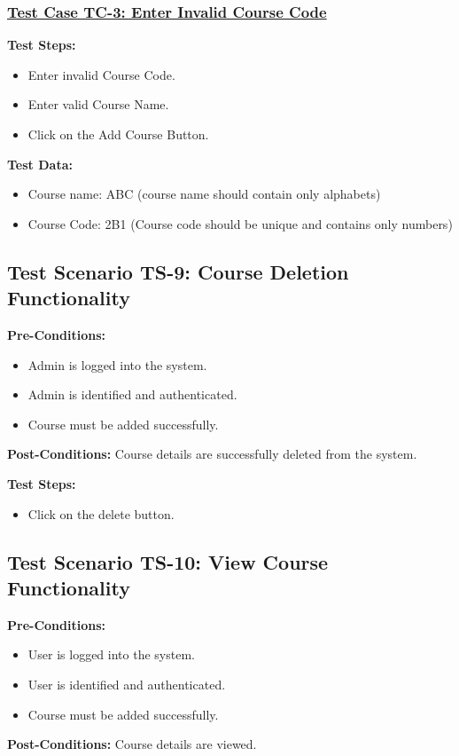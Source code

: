 \subsubsection{\underline{Test Case TC-3: Enter Invalid Course Code}}
\textbf{Test Steps:}
\begin{itemize}

\item Enter invalid Course Code.
\item Enter valid Course Name.
\item Click on the Add Course Button.

\end{itemize}

\textbf{Test Data:}
\begin{itemize}

\item Course name: ABC (course name should contain only alphabets)
\item Course Code: 2B1 (Course code should be unique and contains only numbers)

\end{itemize}

\subsection{Test Scenario TS-9: Course Deletion Functionality}
\textbf{Pre-Conditions: }
\begin{itemize}

\item Admin is logged into the system.
\item Admin is identified and authenticated.
\item Course must be added successfully.

\end{itemize}
\textbf{Post-Conditions: } Course details are successfully deleted from the system.

\textbf{Test Steps:}
\begin{itemize}

\item Click on the delete button.

\end{itemize}

\subsection{Test Scenario TS-10: View Course Functionality}
\textbf{Pre-Conditions: }
\begin{itemize}

\item User is logged into the system.
\item User is identified and authenticated.
\item Course must be added successfully.

\end{itemize}
\textbf{Post-Conditions: } Course details are viewed.

